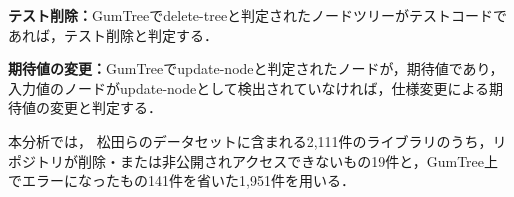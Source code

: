 \documentclass[T,J]{fose} %
\begin{document}
\noindent\textbf{テスト削除：}GumTreeでdelete-treeと判定されたノードツリーがテストコードであれば，テスト削除と判定する．

\noindent\textbf{期待値の変更：}GumTreeでupdate-nodeと判定されたノードが，期待値であり，入力値のノードがupdate-nodeとして検出されていなければ，仕様変更による期待値の変更と判定する．

本分析では，
松田らのデータセットに含まれる2,111件のライブラリのうち，リポジトリが削除・または非公開されアクセスできないもの19件と，GumTree上でエラーになったもの141件を省いた1,951件を用いる．


\end{document}

